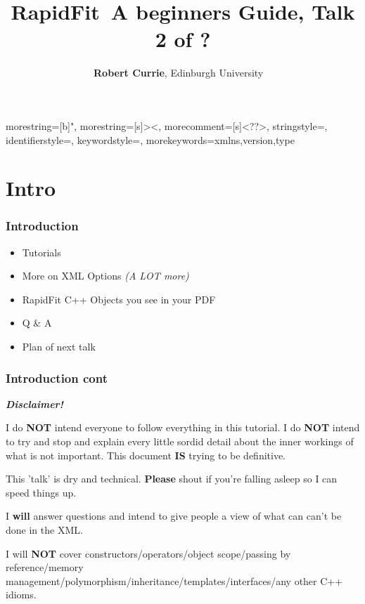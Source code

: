 \documentclass{beamer}
\title{\textbf{RapidFit}\newline~A beginners Guide, Talk 2 of ?}
\author{\textbf{Robert Currie}, Edinburgh University\newline\hspace{.5cm} \textcolor{white}{\textbf{\insertframenumber \vspace{-.33cm}/ \vspace{-.33cm}\inserttotalframenumber}}}
\date{}
\begin{document}

{
  morestring=[b]",
  morestring=[s]{>}{<},
  morecomment=[s]{<?}{?>},
  stringstyle=\color{black},
  identifierstyle=\color{darkblue},
  keywordstyle=\color{cyan},
  morekeywords={xmlns,version,type}%
}

\begin{frame}
\titlepage
\end{frame}

\section{Intro}

\begin{frame}
 \frametitle{Introduction}
 \begin{itemize}
  \item Tutorials\newline
  \item More on XML Options \textit{(A LOT more)}\newline
  \item RapidFit C++ Objects you see in your PDF\newline
  \item Q \& A\newline
  \item Plan of next talk
  \end{itemize}
\end{frame}

\begin{frame}
\frametitle{Introduction cont}

\begin{center}
\textit{\textbf{\Large Disclaimer!}}
\end{center}

I do \textbf{NOT} intend everyone to follow everything in this tutorial.\newline
I do \textbf{NOT} intend to try and stop and explain every little sordid detail about the inner workings of what is not important.\newline
This document \textbf{IS} trying to be definitive.\newline

This 'talk' is dry and technical. \textbf{Please} shout if you're falling asleep so I can speed things up.\newline

I \textbf{will} answer questions and intend to give people a view of what can can't be done in the XML.\newline

\tiny
I will \textbf{NOT} cover constructors/operators/object scope/passing by reference/memory management/polymorphism/inheritance/templates/interfaces/any other C++ idioms.

\end{frame}
\end{document}

